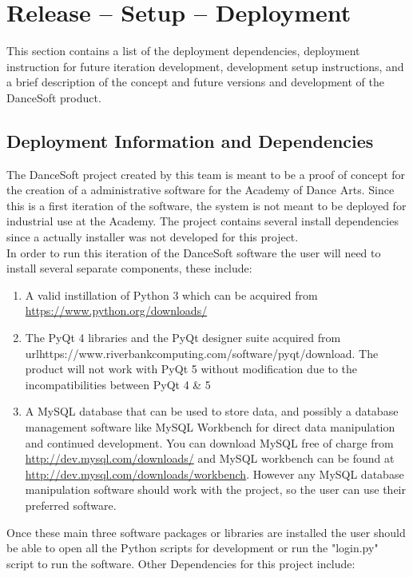 
\chapter{Release -- Setup -- Deployment}
This section contains a list of the deployment dependencies, deployment instruction for future iteration development, development setup instructions, and a brief description of the concept and future versions and development of the DanceSoft product.  


\section{Deployment Information and Dependencies}
The DanceSoft project created by this team is meant to be a proof of concept for the creation of a administrative software for the Academy of Dance Arts. Since this is a first iteration of the software, the system is not meant to be deployed for industrial use at the Academy. The project contains several install dependencies since a actually installer was not developed for this project.\\
In order to run this iteration of the DanceSoft software the user will need to install several separate components, these include:

\begin{enumerate}
\item A valid instillation of Python 3 which can be acquired from \url{https://www.python.org/downloads/}
\item The PyQt 4 libraries and the PyQt designer suite acquired from url{https://www.riverbankcomputing.com/software/pyqt/download}. The product will not work with PyQt 5 without modification due to the incompatibilities between PyQt 4 \& 5
\item A MySQL database that can be used to store data, and possibly a database management software like MySQL Workbench for direct data manipulation and continued development. You can download MySQL free of charge from \url{http://dev.mysql.com/downloads/} and MySQL workbench can be found at \url{http://dev.mysql.com/downloads/workbench}. However any MySQL database manipulation software should work with the project, so the user can use their preferred software.
\end{enumerate}

Once these main three software packages or libraries are installed the user should be able to open all the Python scripts for development or run the "login.py" script to run the software. Other Dependencies for this project include:

